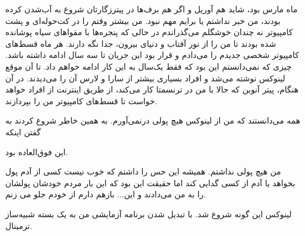 ماه مارس بود، شاید هم آوریل و اگر هم برف‌ها در پیترزگارتان شروع به
آب‌شدن کرده بودند، من خبر نداشتم یا برایم مهم نبود. من بیشتر وقتم را در
کت‌حوله‌ای و پشت کامپیوتر نه چندان خوشگلم می‌گذراندم در حالی که پنجره‌ها
با مقواهای سیاه پوشانده شده بودند تا من را از نور آفتاب و دنیای بیرون،
جدا نگه‌ دارند. هر ماه قسط‌های کامپیوتر شخصی جدیدم‌ را می‌دادم و قرار بود
این جریان تا سه سال ادامه داشته باشد. چیزی که نمی‌دانستم این بود که فقط
یک‌سال به این کار ادامه خواهم داد. تا آن موقع لینوکس نوشته می‌شد و افراد
بسیاری بیشتر از سارا و لارس آن را می‌دیدند. در آن هنگام، پیتر
آنوین که حالا با من در ترنسمتا کار می‌کند، از
طریق اینترنت از افراد خواهد خواست تا قسط‌های کامپیوتر من را بپردازند.

همه می‌دانستند که من از لینوکس هیچ پولی درنمی‌آورم. به همین خاطر شروع
کردند به گفتن اینکه 

این فوق‌العاده بود. 

من هیچ پولی نداشتم. همیشه این حس را داشتم که خوب نیست کسی از آدم پول
بخواهد یا آدم از کسی گدایی کند اما حقیقت این بود که این بار مردم
خودشان پولشان را به من می‌دادند و این... بازهم دارم از خودم جلو می زنم.

لینوکس این گونه شروع شد. با تبدیل شدن برنامه آزمایشی من به یک بسته
شبیه‌ساز ترمینال.

